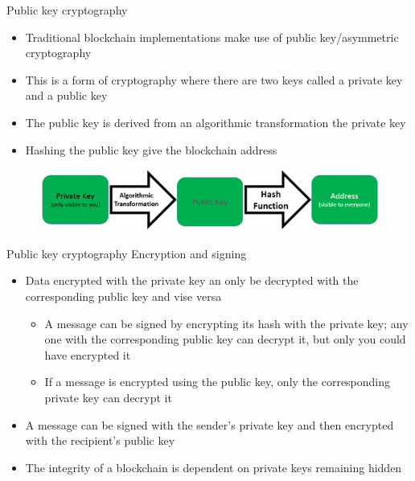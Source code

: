 \documentclass[9pt]{beamer}
\begin{document}


\begin{frame}{Public key cryptography}
	\begin{itemize}
		\item Traditional blockchain implementations make use of public key/asymmetric cryptography
		\item This is a form of cryptography where there are two keys called a private key and a public key
		\item The public key is derived from an algorithmic transformation the private key
		\item Hashing the public key give the blockchain address
	\end{itemize}
	\begin{figure}[]
		\centering
		\includegraphics  [scale=0.3]{Images/keys}
	\end{figure}
\end{frame}




\begin{frame}{Public key cryptography}
	Encryption and signing
	\begin{itemize}
		\item Data encrypted with the private key an only be decrypted with the corresponding public key and vise versa
		\begin{itemize}
			\item A message can be signed by encrypting its hash with the private key; any one with the corresponding public key can decrypt it, but only you could have encrypted it
			\item If a message is encrypted using the public key, only the corresponding private key can decrypt it
		\end{itemize}
		\item A message can be signed with the sender's private key and then encrypted with the recipient's public key
		\item The integrity of a blockchain is dependent on private keys remaining hidden
	\end{itemize}
\end{frame}
\end{document}
